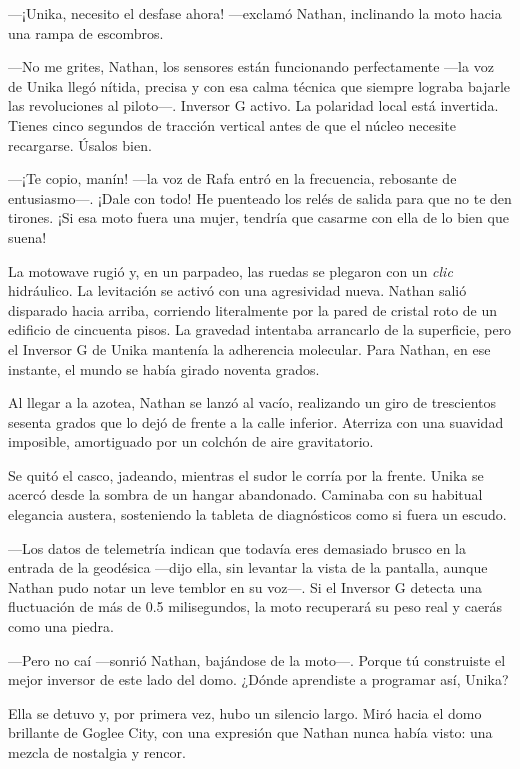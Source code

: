 \documentclass[11pt,twoside]{book}
\begin{document}
---¡Unika, necesito el desfase ahora! ---exclamó Nathan, inclinando la moto hacia una rampa de escombros.

---No me grites, Nathan, los sensores están funcionando perfectamente ---la voz de Unika llegó nítida, precisa y con esa calma técnica que siempre lograba bajarle las revoluciones al piloto---. Inversor G activo. La polaridad local está invertida. Tienes cinco segundos de tracción vertical antes de que el núcleo necesite recargarse. Úsalos bien.

---¡Te copio, manín! ---la voz de Rafa entró en la frecuencia, rebosante de entusiasmo---. ¡Dale con todo! He puenteado los relés de salida para que no te den tirones. ¡Si esa moto fuera una mujer, tendría que casarme con ella de lo bien que suena!

La motowave rugió y, en un parpadeo, las ruedas se plegaron con un \textit{clic} hidráulico. La levitación se activó con una agresividad nueva. Nathan salió disparado hacia arriba, corriendo literalmente por la pared de cristal roto de un edificio de cincuenta pisos. La gravedad intentaba arrancarlo de la superficie, pero el Inversor G de Unika mantenía la adherencia molecular. Para Nathan, en ese instante, el mundo se había girado noventa grados.

Al llegar a la azotea, Nathan se lanzó al vacío, realizando un giro de trescientos sesenta grados que lo dejó de frente a la calle inferior. Aterriza con una suavidad imposible, amortiguado por un colchón de aire gravitatorio.

Se quitó el casco, jadeando, mientras el sudor le corría por la frente. Unika se acercó desde la sombra de un hangar abandonado. Caminaba con su habitual elegancia austera, sosteniendo la tableta de diagnósticos como si fuera un escudo.

---Los datos de telemetría indican que todavía eres demasiado brusco en la entrada de la geodésica ---dijo ella, sin levantar la vista de la pantalla, aunque Nathan pudo notar un leve temblor en su voz---. Si el Inversor G detecta una fluctuación de más de 0.5 milisegundos, la moto recuperará su peso real y caerás como una piedra.

---Pero no caí ---sonrió Nathan, bajándose de la moto---. Porque tú construiste el mejor inversor de este lado del domo. ¿Dónde aprendiste a programar así, Unika?

Ella se detuvo y, por primera vez, hubo un silencio largo. Miró hacia el domo brillante de Goglee City, con una expresión que Nathan nunca había visto: una mezcla de nostalgia y rencor.
\end{document}
